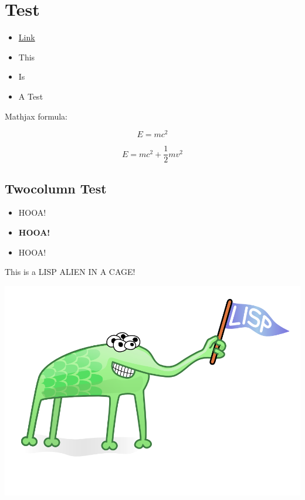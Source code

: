 \section{Test}
\label{sec-8}

\begin{itemize}
\item \href{http://www.google.com}{Link}
\item This
\item Is
\item A Test
\end{itemize}

Mathjax formula:

\[
 E=mc^2
\]

\begin{equation}
 E=mc^2 + \frac{1}{2} mv^2
\end{equation}

\subsection{Twocolumn Test}
\label{sec-8-1}

\begin{container-fluid}
\begin{row-fluid}
\begin{span6}
\begin{itemize}
\item HOOA!
\item \textbf{HOOA!}
\item HOOA!
\end{itemize}
\end{span6}
\begin{span6}
This is a LISP ALIEN IN A CAGE!

\includegraphics[width=.9\linewidth]{img/alien.png}
\end{span6}
\end{row-fluid}
\end{container-fluid}
